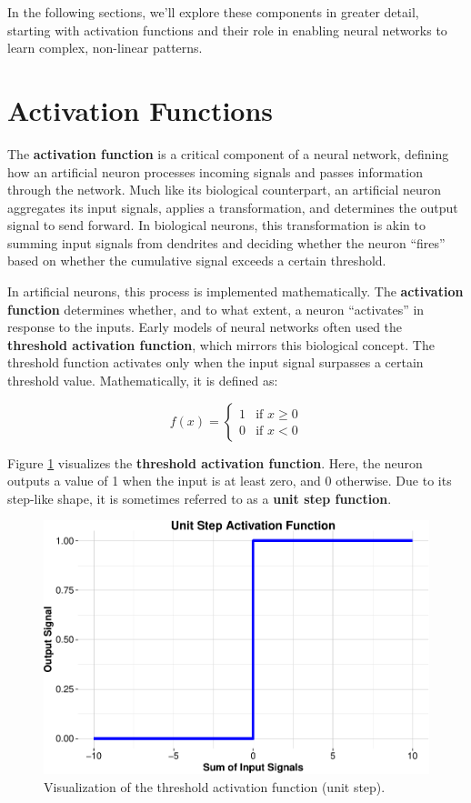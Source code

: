 \documentclass[
]{book}
\theoremstyle{definition}
\theoremstyle{definition}
\theoremstyle{definition}
\theoremstyle{definition}
\theoremstyle{remark}
\begin{document}
In the following sections, we'll explore these components in greater detail, starting with activation functions and their role in enabling neural networks to learn complex, non-linear patterns.

\section{Activation Functions}\label{activation-functions}

The \textbf{activation function} is a critical component of a neural network, defining how an artificial neuron processes incoming signals and passes information through the network. Much like its biological counterpart, an artificial neuron aggregates its input signals, applies a transformation, and determines the output signal to send forward. In biological neurons, this transformation is akin to summing input signals from dendrites and deciding whether the neuron ``fires'' based on whether the cumulative signal exceeds a certain threshold.

In artificial neurons, this process is implemented mathematically. The \textbf{activation function} determines whether, and to what extent, a neuron ``activates'' in response to the inputs. Early models of neural networks often used the \textbf{threshold activation function}, which mirrors this biological concept. The threshold function activates only when the input signal surpasses a certain threshold value. Mathematically, it is defined as:

\[
f(x) = 
\begin{cases} 
1 & \text{if } x \geq 0 \\ 
0 & \text{if } x < 0 
\end{cases}
\]

Figure \ref{fig:active-fun-unit} visualizes the \textbf{threshold activation function}. Here, the neuron outputs a value of 1 when the input is at least zero, and 0 otherwise. Due to its step-like shape, it is sometimes referred to as a \textbf{unit step function}.

\begin{figure}

{\centering \includegraphics[width=0.5\linewidth]{nn_files/figure-latex/active-fun-unit-1} 

}

\caption{Visualization of the threshold activation function (unit step).}\label{fig:active-fun-unit}
\end{figure}
\end{document}
